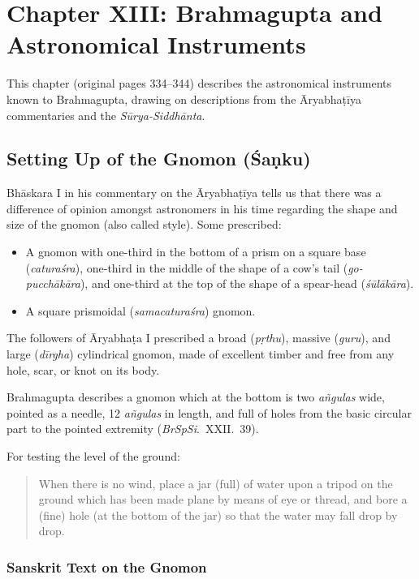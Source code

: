 \documentclass[11pt,a4paper]{article}
\theoremstyle{definition}
\begin{document}
\section{Chapter XIII: Brahmagupta and Astronomical Instruments}
\label{sec:instruments}

This chapter (original pages 334--344) describes the astronomical instruments known to Brahmagupta, drawing on descriptions from the \=Aryabha\d{t}\=iya commentaries and the \textit{S\=urya-Siddh\=anta}.

\subsection{Setting Up of the Gnomon (\'Sa\d{n}ku)}

Bh\=askara I in his commentary on the \=Aryabha\d{t}\=iya tells us that there was a difference of opinion amongst astronomers in his time regarding the shape and size of the gnomon (also called style). Some prescribed:
\begin{itemize}
  \item A gnomon with one-third in the bottom of a prism on a square base (\textit{catura\'sra}), one-third in the middle of the shape of a cow's tail (\textit{go-pucch\=ak\=ara}), and one-third at the top of the shape of a spear-head (\textit{\'s\=ul\=ak\=ara}).
  \item A square prismoidal (\textit{samacatura\'sra}) gnomon.
\end{itemize}

The followers of \=Aryabha\d{t}a I prescribed a broad (\textit{p\d{r}thu}), massive (\textit{guru}), and large (\textit{d\=irgha}) cylindrical gnomon, made of excellent timber and free from any hole, scar, or knot on its body.

Brahmagupta describes a gnomon which at the bottom is two \textit{a\~ngulas} wide, pointed as a needle, 12 \textit{a\~ngulas} in length, and full of holes from the basic circular part to the pointed extremity (\textit{BrSpSi}.\ XXII.\ 39).

For testing the level of the ground:
\begin{quote}
When there is no wind, place a jar (full) of water upon a tripod on the ground which has been made plane by means of eye or thread, and bore a (fine) hole (at the bottom of the jar) so that the water may fall drop by drop.
\end{quote}


\subsubsection{Sanskrit Text on the Gnomon}
\end{document}
